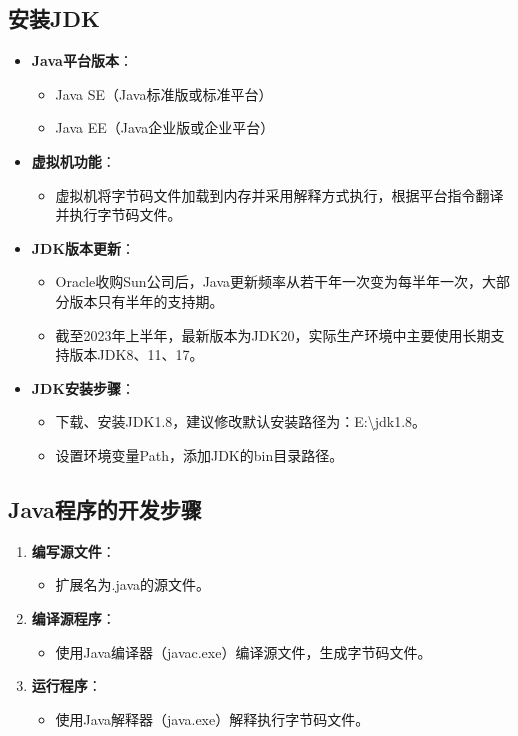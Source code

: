 \documentclass[a4paper, 10pt]{ctexart}
\begin{document}
\subsection{安装JDK}
\begin{itemize}
  \item \textbf{Java平台版本}：
  \begin{itemize}
    \item Java SE（Java标准版或标准平台）
    \item Java EE（Java企业版或企业平台）
  \end{itemize}
  \item \textbf{虚拟机功能}：
  \begin{itemize}
    \item 虚拟机将字节码文件加载到内存并采用解释方式执行，根据平台指令翻译并执行字节码文件。
  \end{itemize}
  \item \textbf{JDK版本更新}：
  \begin{itemize}
    \item Oracle收购Sun公司后，Java更新频率从若干年一次变为每半年一次，大部分版本只有半年的支持期。
    \item 截至2023年上半年，最新版本为JDK20，实际生产环境中主要使用长期支持版本JDK8、11、17。
  \end{itemize}
  \item \textbf{JDK安装步骤}：
  \begin{itemize}
    \item 下载、安装JDK1.8，建议修改默认安装路径为：E:\textbackslash jdk1.8。
    \item 设置环境变量Path，添加JDK的bin目录路径。
  \end{itemize}
\end{itemize}

\subsection{Java程序的开发步骤}
\begin{enumerate}
  \item \textbf{编写源文件}：
  \begin{itemize}
    \item 扩展名为.java的源文件。
  \end{itemize}
  \item \textbf{编译源程序}：
  \begin{itemize}
    \item 使用Java编译器（javac.exe）编译源文件，生成字节码文件。
  \end{itemize}
  \item \textbf{运行程序}：
  \begin{itemize}
    \item 使用Java解释器（java.exe）解释执行字节码文件。
  \end{itemize}
\end{enumerate}
\end{document}
